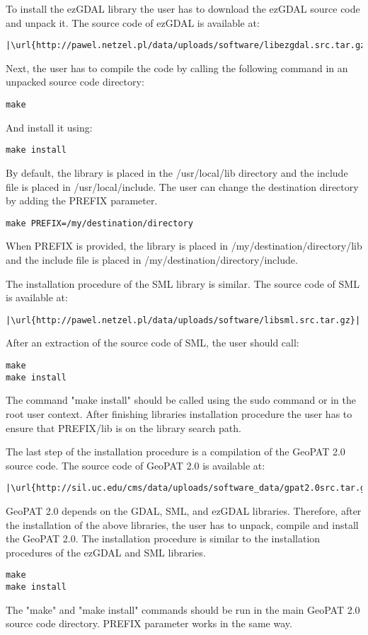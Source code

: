 To install the ezGDAL library the user has to download the ezGDAL source code and unpack it.
The source code of ezGDAL is available at:
\begin{lstlisting}[escapechar=|]
|\url{http://pawel.netzel.pl/data/uploads/software/libezgdal.src.tar.gz}|
\end{lstlisting}
Next, the user has to compile the code by calling the following command in an unpacked source code directory:
\begin{lstlisting}
make
\end{lstlisting}
And install it using:
\begin{lstlisting}
make install
\end{lstlisting}
By default, the library is placed in the /usr/local/lib directory and the include file is placed in /usr/local/include.
The user can change the destination directory by adding the PREFIX parameter.
\begin{lstlisting}
make PREFIX=/my/destination/directory
\end{lstlisting}
When PREFIX is provided, the library is placed in /my/destination/directory/lib and the include file is placed in /my/destination/directory/include.

The installation procedure of the SML library is similar.
The source code of SML is available at:
\begin{lstlisting}[escapechar=|]
|\url{http://pawel.netzel.pl/data/uploads/software/libsml.src.tar.gz}|
\end{lstlisting}
After an extraction of the source code of SML, the user should call: 
\begin{lstlisting}
make
make install
\end{lstlisting}
The command "make install" should be called using the sudo command or in the root user context.
After finishing libraries installation procedure the user has to ensure that PREFIX/lib is on the library search path.

The last step of the installation procedure is a compilation of the GeoPAT 2.0 source code.
The source code of GeoPAT 2.0 is available at:
\begin{lstlisting}[escapechar=|]
|\url{http://sil.uc.edu/cms/data/uploads/software_data/gpat2.0src.tar.gz}|
\end{lstlisting}
GeoPAT 2.0 depends on the GDAL, SML, and ezGDAL libraries.
Therefore, after the installation of the above libraries, the user has to unpack, compile and install the GeoPAT 2.0.
The installation procedure is similar to the installation procedures of the ezGDAL and SML libraries.
\begin{lstlisting}
make
make install
\end{lstlisting}
The "make" and "make install" commands should be run in the main GeoPAT 2.0 source code directory.
PREFIX parameter works in the same way.

